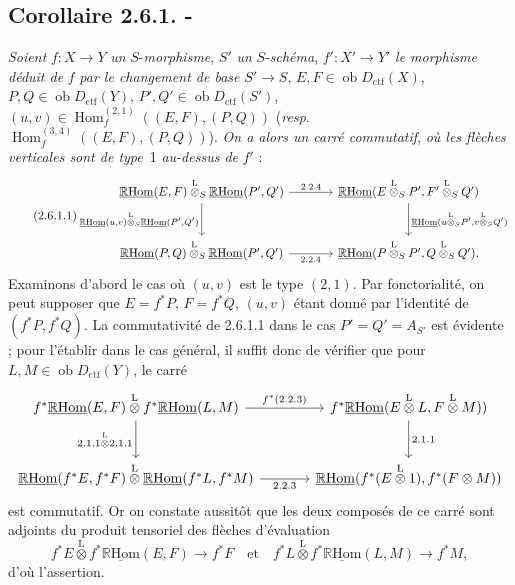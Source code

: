 \documentclass[11pt]{article}
\DeclareMathOperator{\Hom}{Hom}
\newcommand{\R}{\mathbb{R}}\newcommand{\RHomCore}{\mathbb{R}\mathrm{Hom}}
\newcommand{\ob}{\operatorname{ob}}
\providecommand{\RHom}{\RHomCore}
\providecommand{\uRHom}{\underline{\RHom}}
\providecommand{\ctf}{\mathrm{ctf}}
\providecommand{\RHom}{\RHomCore}
\providecommand{\Hom}{\operatorname{Hom}}
\providecommand{\ob}{\operatorname{ob}}
\providecommand{\RHom}{\R\mathcal{H}om}
\providecommand{\R}{\mathrm R}
\providecommand{\RHom}{\RHomCore}
\providecommand{\Hom}{\operatorname{Hom}}
\begin{document}
\subsection*{Corollaire 2.6.1. -}
\emph{Soient} $f:X\to Y$ \emph{un} $S$-\emph{morphisme}, $S'$ \emph{un} $S$-\emph{schéma}, $f':X'\to Y'$ \emph{le morphisme déduit de} $f$ \emph{par le changement de base} $S'\to S$, $E,F\in\ob D_{\ctf}(X)$, $P,Q\in\ob D_{\ctf}(Y)$, $P',Q'\in\ob D_{\ctf}(S')$, $(u,v)\in\Hom_f^{(2,1)}((E,F),(P,Q))$ (\emph{resp}. $\Hom_f^{(3,4)}((E,F),(P,Q))$). \emph{On a alors un carré commutatif}, \emph{où les flèches verticales sont de type}~1 \emph{au-dessus de} $f'$ :
\begin{equation}\tag{2.6.1.1}
\begin{tikzcd}[column sep=large,row sep=large]
\uRHom(E,F)\overset{\mathrm{L}}{\otimes}_S\uRHom(P',Q') \arrow[r,"2.2.4"] \arrow[d,"{\uRHom(u,v)\overset{\mathrm{L}}{\otimes}_S\uRHom(P',Q')}"'] & \uRHom(E\overset{\mathrm{L}}{\otimes}_SP',F'\overset{\mathrm{L}}{\otimes}_SQ') \arrow[d,"{\uRHom(u\overset{\mathrm{L}}{\otimes}_SP',v\overset{\mathrm{L}}{\otimes}_SQ')}"]\\
\uRHom(P,Q)\overset{\mathrm{L}}{\otimes}_S\uRHom(P',Q') \arrow[r,"2.2.4"'] & \uRHom(P\overset{\mathrm{L}}{\otimes}_SP',Q\overset{\mathrm{L}}{\otimes}_SQ').
\end{tikzcd}
\end{equation}
Examinons d'abord le cas où $(u,v)$ est le type $(2,1)$. Par fonctorialité, on peut supposer que $E=f^{*}P$, $F=f^{*}Q$, $(u,v)$ étant donné par l'identité de $(f^{*}P,f^{*}Q)$. La commutativité de 2.6.1.1 dans le cas $P'=Q'=A_{S'}$ est évidente ; pour l'établir dans le cas général, il suffit donc de vérifier que pour $L,M\in\ob D_{\ctf}(Y)$, le carré
\[
\begin{tikzcd}[column sep=large,row sep=large]
f^{*}\uRHom(E,F)\overset{\mathrm{L}}{\otimes} f^{*}\uRHom(L,M) \arrow[r,"{f^*(2.2.3)}"] \arrow[d,"{2.1.1\overset{\mathrm{L}}{\otimes} 2.1.1}"'] & f^{*}\uRHom(E\overset{\mathrm{L}}{\otimes}L,F\overset{\mathrm{L}}{\otimes}M)) \arrow[d,"2.1.1"]\\
\uRHom(f^{*}E,f^{*}F)\overset{\mathrm{L}}{\otimes}\uRHom(f^{*}L,f^{*}M) \arrow[r,"2.2.3"'] & \uRHom(f^{*}(E\overset{\mathrm{L}}{\otimes}1),f^{*}(F\otimes M))
\end{tikzcd}
\]
est commutatif. Or on constate aussitôt que les deux composés de ce carré sont adjoints du produit tensoriel des flèches d'évaluation
\[
f^{*}E\overset{\mathrm{L}}{\otimes} f^{*}\uRHom(E,F)\longrightarrow f^{*}F
\quad\text{et}\quad
f^{*}L\overset{\mathrm{L}}{\otimes} f^{*}\uRHom(L,M)\longrightarrow f^{*}M,
\]
d'où l'assertion.
\end{document}
